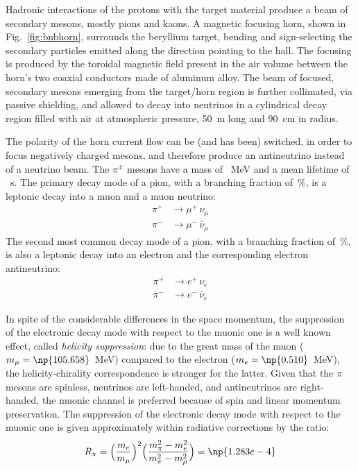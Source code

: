 Hadronic interactions of the protons with the target material produce a beam of %
secondary mesons, mostly pions and kaons. 
A magnetic focusing horn, shown in Fig.~\ref{fig:bnbhorn}, surrounds the beryllium target, %
bending and sign-selecting the secondary particles emitted along the direction pointing to the hall.
The focusing is produced by the toroidal magnetic field present in the air volume %
between the horn’s two coaxial conductors made of aluminum alloy. 
The beam of focused, secondary mesons emerging from the target/horn region is further collimated, %
via passive shielding, and allowed to decay into neutrinos in a cylindrical decay %
region filled with air at atmospheric pressure, 50~m long and 90~cm in radius. 

The polarity of the horn current flow can be (and has been) switched, in order to %
focus negatively charged mesons, and therefore produce an antineutrino instead of a neutrino beam.
The $\pi^{\pm}$ mesons have a mass of ~MeV and a mean lifetime of ~s.
The primary decay mode of a pion, with a branching fraction of \,\%, is a leptonic %
decay into a muon and a muon neutrino:
\begin{align}
  \pi^+ &\rightarrow \mu^+ \, \nu_\mu \\
  \pi^- &\rightarrow \mu^- \, \bar{\nu}_\mu
\end{align}
The second most common decay mode of a pion, with a branching fraction of \,\%, %
is also a leptonic decay into an electron and the corresponding electron antineutrino:
\begin{align}
  \pi^+ &\rightarrow e^+ \, \nu_e \\
  \pi^- &\rightarrow e^- \, \bar{\nu}_e
\end{align}

In spite of the considerable differences in the space momentum, the suppression of the %
electronic decay mode with respect to the muonic one is a well known effect, called %
\emph{helicity suppression}: due to the great mass of the muon ($m_\mu = \np{105.658}$~MeV) %
compared to the electron ($m_e = \np{0.510}$~MeV), the helicity-chirality correspondence %
is stronger for the latter.
Given that the $\pi$ mesons are spinless, neutrinos are left-handed, and antineutrinos are %
right-handed, the muonic channel is preferred because of spin and linear momentum preservation.
The suppression of the electronic decay mode with respect to the muonic one is given %
approximately within radiative corrections by the ratio:
\begin{equation}
  R_\pi = \Bigl ( \frac{m_e}{m_\mu} \Bigr )^2 
  \Bigl (\frac{m_\pi^2 - m_e^2}{m_\pi^2 - m_\mu^2} \Bigr )
  = \np{1.283e-4}
\end{equation}

